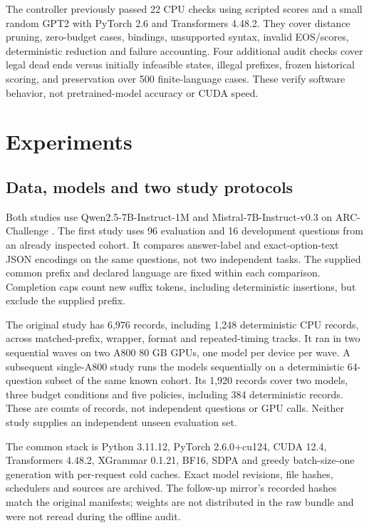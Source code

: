 \documentclass[12pt,a4paper]{article}
\begin{document}
The controller previously passed 22 CPU checks using scripted scores and a small random GPT2 with PyTorch 2.6 and Transformers 4.48.2. They cover distance pruning, zero-budget cases, bindings, unsupported syntax, invalid EOS/scores, deterministic reduction and failure accounting. Four additional audit checks cover legal dead ends versus initially infeasible states, illegal prefixes, frozen historical scoring, and preservation over 500 finite-language cases. These verify software behavior, not pretrained-model accuracy or CUDA speed.

\section{Experiments}\label{sec:experiments}
\subsection{Data, models and two study protocols}
Both studies use Qwen2.5-7B-Instruct-1M \citep{yang2025} and Mistral-7B-Instruct-v0.3 \citep{mistral2024} on ARC-Challenge \citep{clark2018}. The first study uses 96 evaluation and 16 development questions from an already inspected cohort. It compares answer-label and exact-option-text JSON encodings on the same questions, not two independent tasks. The supplied common prefix and declared language are fixed within each comparison. Completion caps count new suffix tokens, including deterministic insertions, but exclude the supplied prefix.

The original study has 6,976 records, including 1,248 deterministic CPU records, across matched-prefix, wrapper, format and repeated-timing tracks. It ran in two sequential waves on two A800 80 GB GPUs, one model per device per wave. A subsequent single-A800 study runs the models sequentially on a deterministic 64-question subset of the same known cohort. Its 1,920 records cover two models, three budget conditions and five policies, including 384 deterministic records. These are counts of records, not independent questions or GPU calls. Neither study supplies an independent unseen evaluation set.

The common stack is Python 3.11.12, PyTorch 2.6.0+cu124, CUDA 12.4, Transformers 4.48.2, XGrammar 0.1.21, BF16, SDPA and greedy batch-size-one generation with per-request cold caches. Exact model revisions, file hashes, schedulers and sources are archived. The follow-up mirror's recorded hashes match the original manifests; weights are not distributed in the raw bundle and were not reread during the offline audit.
\end{document}

